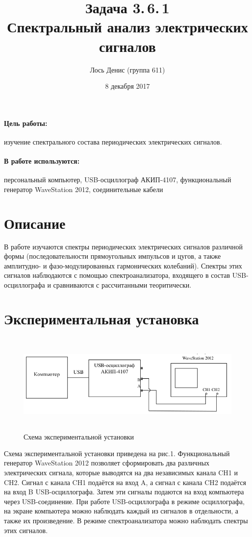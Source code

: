 \documentclass[12pt]{article}
\title{{\bf Задача 3.\,6.\,1 \\ Спектральный анализ электрических сигналов}}
\author{Лось Денис (группа 611)}
\date{8 декабря 2017}
\begin{document}
\maketitle

\paragraph{Цель работы: } изучение спектрального состава периодических электрических сигналов.

\paragraph{В работе используются: } персональный компьютер, USB-осциллограф АКИП-4107, функциональный генератор WaveStation 2012, соединительные кабели
\section*{Описание}
	В работе изучаются спектры периодических электрических сигналов различной формы (последовательности прямоугольных импульсов и цугов, а также амплитудно- и фазо-модулированных гармонических колебаний). Спектры этих сигналов наблюдаются  с помощью спектроанализатора, входящего в состав USB-осциллографа и сравниваются с рассчитанными теоритически.
\section*{Экспериментальная установка}
\begin{figure}[h!]
	\centering
	\includegraphics[width = 12cm, height = 5cm]{image1.png}
	\caption{Схема экспериментальной установки}
\end{figure}
\par
	Схема экспериментальной установки приведена на рис.1. Функциональный генератор WaveStation 2012 позволяет сформировать два различных электрических сигнала, которые выводятся на два независимых канала CH1 и CH2. Сигнал с канала CH1 подаётся на вход A, а сигнал с канала CH2 подаётся на вход B USB-осциллографа. Затем эти сигналы подаются на вход компьютера через USB-соединение. При работе USB-осциллографа в режиме осциллографа, на экране компьютера можно наблюдать каждый из сигналов в отдельности, а также их произведение. В режиме спектроанализатора можно наблюдать спектры этих сигналов.
\end{document}
